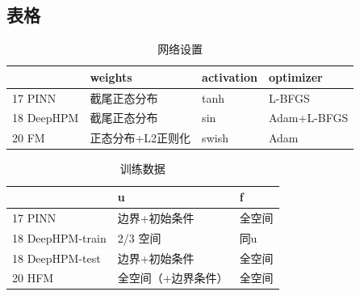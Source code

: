 \subsection{表格}
\begin{frame}{\subsecname}

	\begin{table}
		\caption{网络设置}	
		\centering %
		\begin{tabular}{|l|l|l|l|}
			\hline                            & \textbf{weights}           & \textbf{activation} & \textbf{optimizer}   \\	
			\hline 17 PINN                    & 截尾正态分布      & tanh       & L-BFGS     \\
			\hline 18  DeepHPM				 & 截尾正态分布      & sin        & Adam+L-BFGS \\
			\hline 20 FM                     & 正态分布+L2正则化 & swish      & Adam        \\
			\hline			
		\end{tabular}

	\end{table}

	\begin{table}	
		\caption{训练数据}

		\begin{tabular}{|l|l|l|}	
			\hline                          &   u                   & f      \\
			\hline 17 PINN                   & 边界+初始条件       & 全空间 \\
			\hline 18  DeepHPM-train 		 & 2/3 空间          & 同u    \\
			\hline 18 DeepHPM-test             & 边界+初始条件       & 全空间 \\
			\hline 20 HFM                     & 全空间（+边界条件） & 全空间 \\	
			\hline
		\end{tabular}

	\end{table}	
\end{frame}


